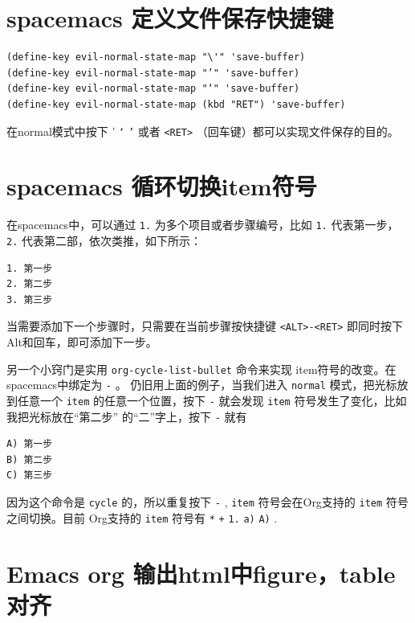 \documentclass[10pt,a4paper,UTF8]{article}
\begin{document}
\section{spacemacs 定义文件保存快捷键}
\label{sec:org3978c45}


\lstset{language=Lisp,label= ,caption= ,captionpos=b,numbers=none}
\begin{lstlisting}
(define-key evil-normal-state-map "\'" 'save-buffer)
(define-key evil-normal-state-map "’" 'save-buffer)
(define-key evil-normal-state-map "‘" 'save-buffer)
(define-key evil-normal-state-map (kbd "RET") 'save-buffer)
\end{lstlisting}

在normal模式中按下  '  \texttt{‘}  \texttt{’} 或者 \texttt{<RET>} （回车键）都可以实现文件保存的目的。

\section{spacemacs 循环切换item符号}
\label{sec:org43cfd44}


在spacemacs中，可以通过 \texttt{1.} 为多个项目或者步骤编号，比如 \texttt{1.} 代表第一步， \texttt{2.} 代表第二部，依次类推，如下所示：
\lstset{language=org,label= ,caption= ,captionpos=b,numbers=none}
\begin{lstlisting}
1. 第一步
2. 第二步
3. 第三步
\end{lstlisting}

当需要添加下一个步骤时，只需要在当前步骤按快捷键 \texttt{<ALT>-<RET>} 即同时按下 Alt和回车，即可添加下一步。

另一个小窍门是实用 \texttt{org-cycle-list-bullet} 命令来实现 item符号的改变。在spacemacs中绑定为 \texttt{-} 。 仍旧用上面的例子，当我们进入 \texttt{normal} 模式，把光标放到任意一个 \texttt{item} 的任意一个位置，按下 \texttt{-} 就会发现 \texttt{item} 符号发生了变化，比如我把光标放在“第二步” 的“二”字上，按下 \texttt{-} 就有
\lstset{language=org,label= ,caption= ,captionpos=b,numbers=none}
\begin{lstlisting}
A) 第一步
B) 第二步
C) 第三步
\end{lstlisting}

因为这个命令是 \texttt{cycle} 的，所以重复按下 \texttt{-} , \texttt{item} 符号会在Org支持的 \texttt{item} 符号之间切换。目前 Org支持的 \texttt{item} 符号有 \texttt{*} \texttt{+} \texttt{1.} \texttt{a)} \texttt{A)} .
\section{Emacs org 输出html中figure，table对齐}
\label{sec:org431920a}
\end{document}
